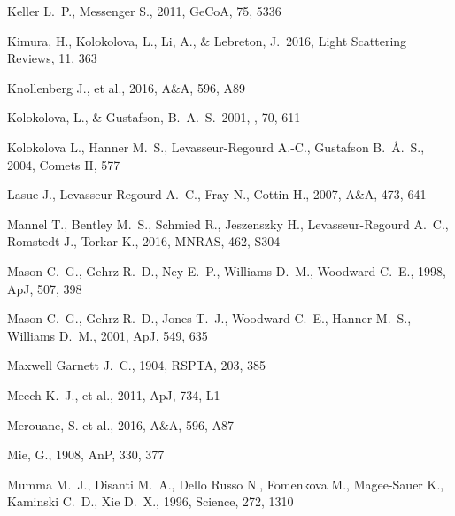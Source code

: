 \documentclass[a4paper,fleqn,usenatbib]{mnras}
\begin{document}
\begin{thebibliography}{99}
 Keller L.~P., Messenger S., 2011, GeCoA, 75, 5336

 Kimura, H., Kolokolova, L., Li, A., \& Lebreton, J.\ 2016, Light Scattering Reviews, 11, 363

 Knollenberg J., et al., 2016, A\&A, 596, A89

 Kolokolova, L., \& Gustafson, B.~A.~S.\ 2001, \jqsrt, 70, 611

 Kolokolova L., Hanner M.~S., Levasseur-Regourd A.-C., Gustafson B.~{\AA}.~S., 2004, Comets II, 577


 Lasue J., Levasseur-Regourd A.~C., Fray N., Cottin H., 2007, A\&A, 473, 641

 Mannel T., Bentley M.~S., Schmied R., Jeszenszky H., Levasseur-Regourd A.~C., Romstedt J., Torkar K., 2016, MNRAS, 462, S304

 Mason C.~G., Gehrz R.~D., Ney E.~P., Williams D.~M., Woodward C.~E., 1998, ApJ, 507, 398

 Mason C.~G., Gehrz R.~D., Jones T.~J., Woodward C.~E., Hanner M.~S., Williams D.~M., 2001, ApJ, 549, 635

 Maxwell Garnett J.~C., 1904, RSPTA, 203, 385

 Meech K.~J., et al., 2011, ApJ, 734, L1

 Merouane, S. et al., 2016, A\&A, 596, A87

 Mie, G., 1908, AnP, 330, 377

 Mumma M.~J., Disanti M.~A., Dello Russo N., Fomenkova M., Magee-Sauer K., Kaminski C.~D., Xie D.~X., 1996, Science, 272, 1310



\end{thebibliography}
\end{document}
